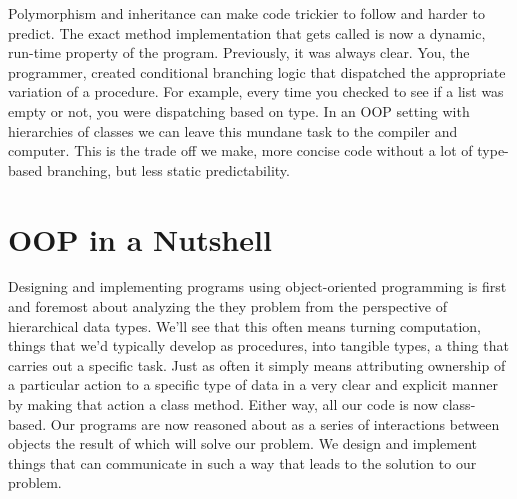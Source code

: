 \documentclass[]{tufte-handout}
\begin{document}
Polymorphism and inheritance can make code trickier to follow and harder to predict. The exact method implementation that gets called is now a dynamic, run-time property of the program. Previously, it was always clear. You, the programmer, created conditional branching logic that dispatched the appropriate variation of a procedure. For example, every time you checked to see if a list was empty or not, you were dispatching based on type. In an OOP setting with hierarchies of classes we can leave this mundane task to the compiler and computer. This is the trade off we make, more concise code without a lot of type-based branching, but less static predictability. 

\section{OOP in a Nutshell}

Designing and implementing programs using object-oriented programming is first and foremost about analyzing the they problem from the perspective of hierarchical data types. We'll see that this often means turning computation, things that we'd typically develop as procedures, into tangible types, a thing that carries out a specific task. Just as often it simply means attributing ownership of a particular action to a specific type of data in a very clear and explicit manner by making that action a class method. Either way, all our code is now class-based. Our programs are now reasoned about as a series of interactions between objects the result of which will solve our problem. We design and implement things that can communicate in such a way that leads to the solution to our problem.
\end{document}

